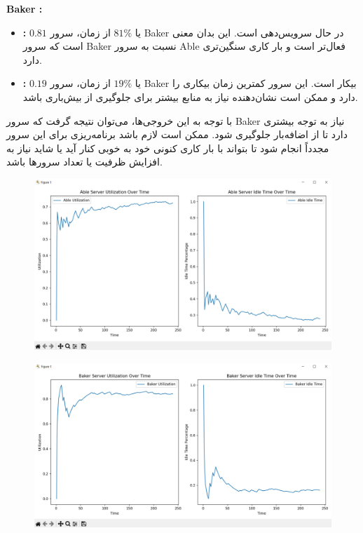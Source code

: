 \textbf{Baker :}
\begin{itemize}
	\item \textbf{ :} \(0.81\) یا \(81\%\) از زمان، سرور Baker در حال سرویس‌دهی است. این بدان معنی است که سرور Baker نسبت به سرور Able فعال‌تر است و بار کاری سنگین‌تری دارد.
	\item \textbf{ :} \(0.19\) یا \(19\%\) از زمان، سرور Baker بیکار است. این سرور کمترین زمان بیکاری را دارد و ممکن است نشان‌دهنده نیاز به منابع بیشتر برای جلوگیری از بیش‌باری باشد.
\end{itemize}

با توجه به این خروجی‌ها، می‌توان نتیجه گرفت که سرور Baker نیاز به توجه بیشتری دارد تا از اضافه‌بار جلوگیری شود. ممکن است لازم باشد برنامه‌ریزی برای این سرور مجدداً انجام شود تا بتواند با بار کاری کنونی خود به خوبی کنار آید یا شاید نیاز به افزایش ظرفیت یا تعداد سرورها باشد.

\begin{figure}[h]
	\centering
	\includegraphics{pic1.jpg}
	\label{fig:label4}
\end{figure}

\begin{figure}[h]
	\centering
	\includegraphics{pic2.jpg}
	\label{fig:label4}
\end{figure}